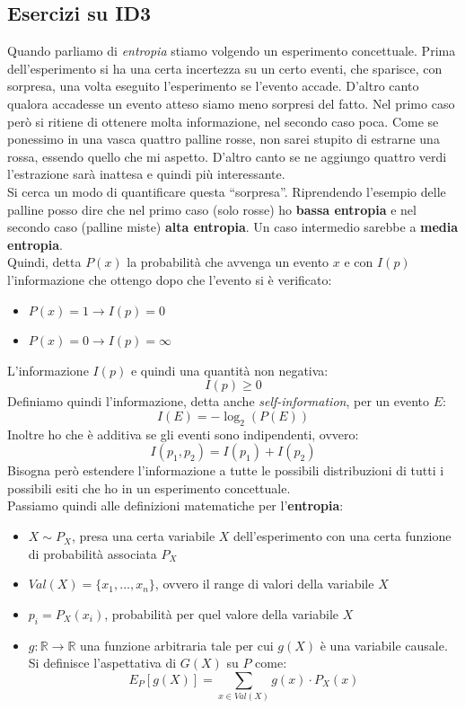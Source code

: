 \subsection{Esercizi su ID3}
Quando parliamo di \textit{entropia} stiamo volgendo un esperimento
concettuale. Prima dell'esperimento si ha una certa incertezza su un certo
eventi, che sparisce, con sorpresa, una volta eseguito l'esperimento se l'evento
accade. D'altro canto qualora accadesse un evento atteso siamo meno sorpresi del
fatto. Nel primo caso però si ritiene di ottenere molta informazione, nel
secondo caso poca. Come se ponessimo in una vasca quattro palline rosse, non
sarei stupito di estrarne una rossa, essendo quello che mi aspetto. D'altro
canto se ne aggiungo quattro verdi l'estrazione sarà inattesa e quindi più
interessante.\\ 
Si cerca un modo di quantificare questa ``sorpresa''. Riprendendo l'esempio
delle palline posso dire che nel primo caso (solo rosse) ho \textbf{bassa
  entropia} e nel secondo caso (palline miste) \textbf{alta entropia}. Un caso
intermedio sarebbe a \textbf{media entropia}.\\
Quindi, detta $P(x)$ la probabilità che avvenga un evento $x$ e con $I(p)$
l'informazione che ottengo dopo che l'evento si è verificato:
\begin{itemize}
  \item $P(x)=1\to I(p)=0$
  \item $P(x)=0\to I(p)=\infty$
\end{itemize}
L'informazione $I(p)$ e quindi una quantità non negativa:
\[I(p)\geq 0\]
Definiamo quindi l'informazione, detta anche \textit{self-information}, per un
evento $E$: 
\[I(E)=-\log_2(P(E))\]
Inoltre ho che è additiva se gli eventi sono indipendenti, ovvero:
\[I(p_1, p_2)=I(p_1)+I(p_2)\]
Bisogna però estendere l'informazione a tutte le possibili distribuzioni di
tutti i possibili esiti che ho in un esperimento concettuale.\\
Passiamo quindi alle definizioni matematiche per l'\textbf{entropia}:
\begin{itemize}
  \item $X\sim P_X$, presa una certa variabile $X$ dell'esperimento con una
  certa funzione di probabilità associata $P_X$
  \item $Val(X)=\{x_1,\ldots, x_n\}$, ovvero il range di valori della variabile
  $X$
  \item $p_i=P_X(x_i)$, probabilità per quel valore della variabile $X$
  \item $g:\mathbb{R}\to\mathbb{R}$ una funzione arbitraria tale per cui $g(X)$
  è una variabile causale. Si definisce l'aspettativa di $G(X)$ su $P$ come:
  \[E_P[g(X)]=\sum_{x\in Val(X)} g(x)\cdot P_X(x)\]
\end{itemize}
